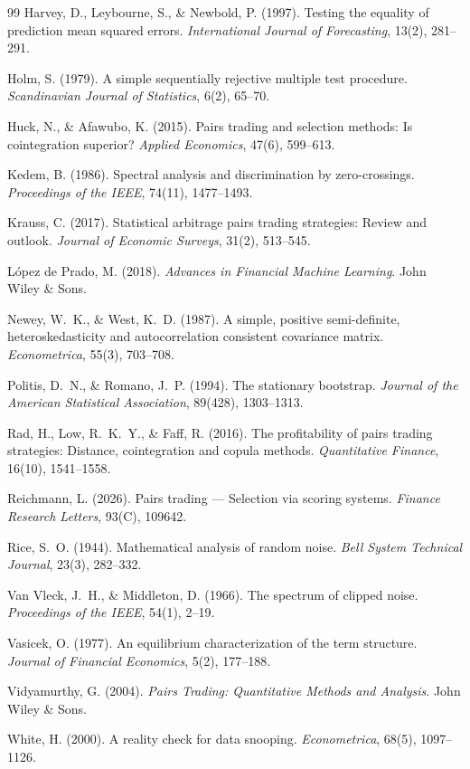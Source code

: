 \documentclass[11pt,a4paper]{article}
\theoremstyle{definition}
\begin{document}
\begin{thebibliography}{99}
Harvey, D., Leybourne, S., \& Newbold, P. (1997).
Testing the equality of prediction mean squared errors.
\textit{International Journal of Forecasting}, 13(2), 281--291.

Holm, S. (1979).
A simple sequentially rejective multiple test procedure.
\textit{Scandinavian Journal of Statistics}, 6(2), 65--70.

Huck, N., \& Afawubo, K. (2015).
Pairs trading and selection methods: Is cointegration superior?
\textit{Applied Economics}, 47(6), 599--613.

Kedem, B. (1986).
Spectral analysis and discrimination by zero-crossings.
\textit{Proceedings of the IEEE}, 74(11), 1477--1493.

Krauss, C. (2017).
Statistical arbitrage pairs trading strategies: Review and outlook.
\textit{Journal of Economic Surveys}, 31(2), 513--545.

L\'opez de Prado, M. (2018).
\textit{Advances in Financial Machine Learning}.
John Wiley \& Sons.

Newey, W.~K., \& West, K.~D. (1987).
A simple, positive semi-definite, heteroskedasticity and autocorrelation
consistent covariance matrix.
\textit{Econometrica}, 55(3), 703--708.

Politis, D.~N., \& Romano, J.~P. (1994).
The stationary bootstrap.
\textit{Journal of the American Statistical Association}, 89(428), 1303--1313.

Rad, H., Low, R.~K.~Y., \& Faff, R. (2016).
The profitability of pairs trading strategies: Distance, cointegration and
copula methods.
\textit{Quantitative Finance}, 16(10), 1541--1558.

Reichmann, L. (2026).
Pairs trading --- Selection via scoring systems.
\textit{Finance Research Letters}, 93(C), 109642.

Rice, S.~O. (1944).
Mathematical analysis of random noise.
\textit{Bell System Technical Journal}, 23(3), 282--332.

Van Vleck, J.~H., \& Middleton, D. (1966).
The spectrum of clipped noise.
\textit{Proceedings of the IEEE}, 54(1), 2--19.

Vasicek, O. (1977).
An equilibrium characterization of the term structure.
\textit{Journal of Financial Economics}, 5(2), 177--188.

Vidyamurthy, G. (2004).
\textit{Pairs Trading: Quantitative Methods and Analysis}.
John Wiley \& Sons.

White, H. (2000).
A reality check for data snooping.
\textit{Econometrica}, 68(5), 1097--1126.

\end{thebibliography}
\end{document}

